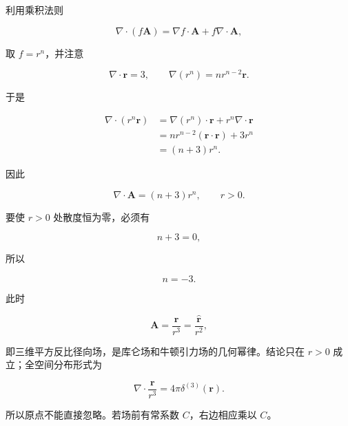 利用乘积法则

\[
\nabla\cdot(f\mathbf A)
=\nabla f\cdot\mathbf A+f\nabla\cdot\mathbf A,
\]

取 \(f=r^n\)，并注意

\[
\nabla\cdot\mathbf r=3,
\qquad
\nabla(r^n)=nr^{n-2}\mathbf r.
\]

于是

\[
\begin{aligned}
\nabla\cdot(r^n\mathbf r)
&=\nabla(r^n)\cdot\mathbf r
+r^n\nabla\cdot\mathbf r\\
&=nr^{n-2}(\mathbf r\cdot\mathbf r)+3r^n\\
&=(n+3)r^n.
\end{aligned}
\]

因此

\[
\boxed{
\nabla\cdot\mathbf A=(n+3)r^n
},
\qquad r>0.
\]

要使 \(r>0\) 处散度恒为零，必须有

\[
n+3=0,
\]

所以

\[
\boxed{n=-3}.
\]

此时

\[
\mathbf A=\frac{\mathbf r}{r^3}
=\frac{\hat{\mathbf r}}{r^2},
\]

即三维平方反比径向场，是库仑场和牛顿引力场的几何幂律。结论只在 \(r>0\)
成立；全空间分布形式为

\[
\nabla\cdot\frac{\mathbf r}{r^3}
=4\pi\delta^{(3)}(\mathbf r).
\]

所以原点不能直接忽略。若场前有常系数 \(C\)，右边相应乘以 \(C\)。


